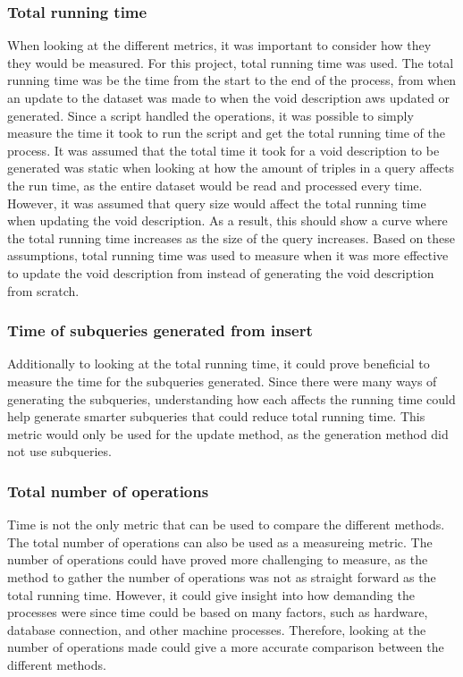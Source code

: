 \subsubsection{Total running time}
When looking at the different metrics, it was important to consider how they they would be measured. For this project, total running time was used. The total running time was be the time from the start to the end of the process, from when an update to the dataset was made to when the \gls{void} description aws updated or generated. Since a script handled the operations, it was possible to simply measure the time it took to run the script and get the total running time of the process.
It was assumed that the total time it took for a \gls{void} description to be generated was static when looking at how the amount of triples in a query affects the run time, as the entire dataset would be read and processed every time. However, it was assumed that query size would affect the total running time when updating the \gls{void} description. As a result, this should show a curve where the total running time increases as the size of the query increases. Based on these assumptions, total running time was used to measure when it was more effective to update the \gls{void} description from instead of generating the \gls{void} description from scratch.

\subsubsection{Time of subqueries generated from insert}
Additionally to looking at the total running time, it could prove beneficial to measure the time for the subqueries generated. Since there were many ways of generating the subqueries, understanding how each affects the running time could help generate smarter subqueries that could reduce total running time. This metric would only be used for the update method, as the generation method did not use subqueries.

\subsubsection{Total number of operations}
Time is not the only metric that can be used to compare the different methods. The total number of operations can also be used as a measureing metric. The number of operations could have proved more challenging to measure, as the method to gather the number of operations was not as straight forward as the total running time. However, it could give insight into how demanding the processes were since time could be based on many factors, such as hardware, database connection, and other machine processes. Therefore, looking at the number of operations made could give a more accurate comparison between the different methods.



